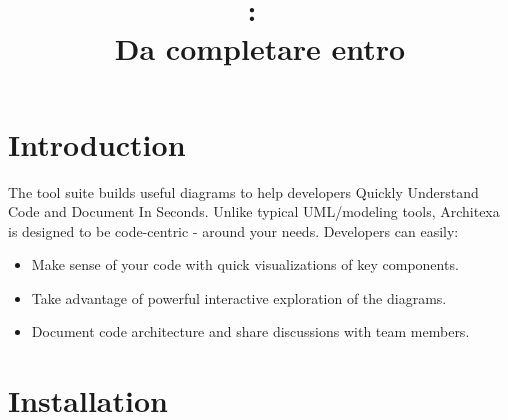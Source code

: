 \documentclass{article}
\title{
\vspace{2in}
\textmd{\textbf{\hmwkClass:\ \hmwkTitle}}\\
\normalsize\vspace{0.1in}\small{Da completare entro \hmwkDueDate}\\
\vspace{0.1in}\large{\textit{\hmwkClassInstructor}}
\vspace{3in}
}
\author{\textbf{\hmwkAuthorName}}
\date{} %
\begin{document}
\maketitle



\newpage
\tableofcontents
\newpage



\section{Introduction}

The tool suite builds useful diagrams to help developers Quickly
Understand Code and Document In Seconds. Unlike typical UML/modeling
tools, Architexa is designed to be code-centric - around your
needs. Developers can easily:


\begin{itemize}

\item Make sense of your code with quick visualizations of key components.
\item Take advantage of powerful interactive exploration of the diagrams.
\item Document code architecture and share discussions with team members.

\end{itemize}

\section{Installation}
\end{document}
